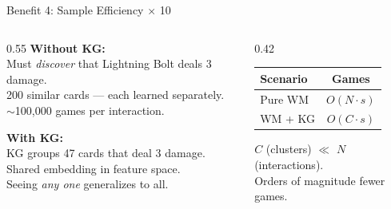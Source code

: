 \documentclass[aspectratio=169, 11pt]{beamer}
\begin{document}
\begin{frame}{Benefit 4: Sample Efficiency $\times$ 10}
  \begin{columns}[T]
    \begin{column}{0.55\textwidth}
      \textbf{Without KG:}\\
      Must \textit{discover} that Lightning Bolt deals 3 damage.\\
      200 similar cards --- each learned separately.\\
      $\sim$100{,}000 games per interaction.
      \vspace{0.3cm}

      \textbf{With KG:}\\
      KG groups 47 cards that deal 3 damage.\\
      Shared embedding in feature space.\\
      Seeing \textit{any one} generalizes to all.
    \end{column}
    \begin{column}{0.42\textwidth}
      \begin{center}
      \begin{tabular}{@{}lc@{}}
        \toprule
        \textbf{Scenario} & \textbf{Games} \\
        \midrule
        Pure WM & $O(N \cdot s)$ \\
        WM + KG & $O(C \cdot s)$ \\
        \bottomrule
      \end{tabular}
      \end{center}
      \vspace{0.3cm}
      \footnotesize $C$ (clusters) $\ll$ $N$ (interactions).\\
      Orders of magnitude fewer games.
    \end{column}
  \end{columns}
\end{frame}
\end{document}
